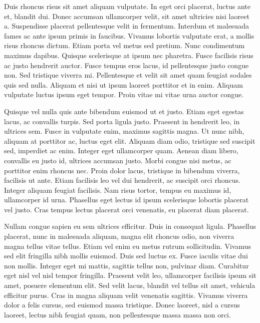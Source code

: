 Duis rhoncus risus sit amet aliquam vulputate. In eget orci placerat, luctus ante et, blandit dui. Donec accumsan ullamcorper velit, sit amet ultricies nisi laoreet a. Suspendisse placerat pellentesque velit in fermentum. Interdum et malesuada fames ac ante ipsum primis in faucibus. Vivamus lobortis vulputate erat, a mollis risus rhoncus dictum. Etiam porta vel metus sed pretium. Nunc condimentum maximus dapibus. Quisque scelerisque at ipsum nec pharetra. Fusce facilisis risus ac justo hendrerit auctor. Fusce tempus eros lacus, id pellentesque justo congue non. Sed tristique viverra mi. Pellentesque et velit sit amet quam feugiat sodales quis sed nulla. Aliquam et nisi ut ipsum laoreet porttitor et in enim. Aliquam vulputate luctus ipsum eget tempor. Proin vitae mi vitae urna auctor congue.

Quisque vel nulla quis ante bibendum euismod ut et justo. Etiam eget egestas lacus, ac convallis turpis. Sed porta ligula justo. Praesent in hendrerit leo, in ultrices sem. Fusce in vulputate enim, maximus sagittis magna. Ut nunc nibh, aliquam at porttitor ac, luctus eget elit. Aliquam diam odio, tristique sed suscipit sed, imperdiet ac enim. Integer eget ullamcorper quam. Aenean diam libero, convallis eu justo id, ultrices accumsan justo. Morbi congue nisi metus, ac porttitor enim rhoncus nec. Proin dolor lacus, tristique in bibendum viverra, facilisis ut ante. Etiam facilisis leo vel dui hendrerit, ac suscipit orci rhoncus. Integer aliquam feugiat facilisis. Nam risus tortor, tempus eu maximus id, ullamcorper id urna. Phasellus eget lectus id ipsum scelerisque lobortis placerat vel justo. Cras tempus lectus placerat orci venenatis, eu placerat diam placerat.

Nullam congue sapien eu sem ultrices efficitur. Duis in consequat ligula. Phasellus placerat, nunc in malesuada aliquam, magna elit rhoncus odio, non viverra magna tellus vitae tellus. Etiam vel enim eu metus rutrum sollicitudin. Vivamus sed elit fringilla nibh mollis euismod. Duis sed luctus ex. Fusce iaculis vitae dui non mollis. Integer eget mi mattis, sagittis tellus non, pulvinar diam. Curabitur eget nisl vel nisl tempor fringilla. Praesent velit leo, ullamcorper facilisis ipsum sit amet, posuere elementum elit. Sed velit lacus, blandit vel tellus sit amet, vehicula efficitur purus. Cras in magna aliquam velit venenatis sagittis. Vivamus viverra dolor a felis cursus, sed euismod massa tristique. Donec laoreet, nisl a cursus laoreet, lectus nibh feugiat quam, non pellentesque massa massa non orci.

